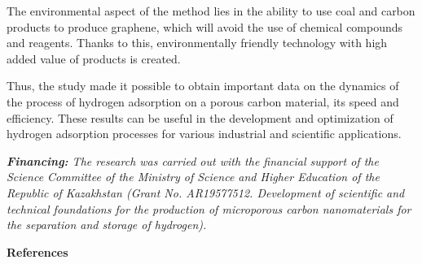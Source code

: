 \begin{multicols}{2}
The environmental aspect of the method lies in the ability to use coal
and carbon products to produce graphene, which will avoid the use of
chemical compounds and reagents. Thanks to this, environmentally
friendly technology with high added value of products is created.

Thus, the study made it possible to obtain important data on the
dynamics of the process of hydrogen adsorption on a porous carbon
material, its speed and efficiency. These results can be useful in the
development and optimization of hydrogen adsorption processes for
various industrial and scientific applications.

\emph{{\bfseries Financing:} The research was carried out with the
financial support of the Science Committee of the Ministry of Science
and Higher Education of the Republic of Kazakhstan (Grant No.
AR19577512. Development of scientific and technical foundations for the
production of microporous carbon nanomaterials for the separation and
storage of hydrogen).}
\end{multicols}

\begin{center}
{\bfseries References}
\end{center}


